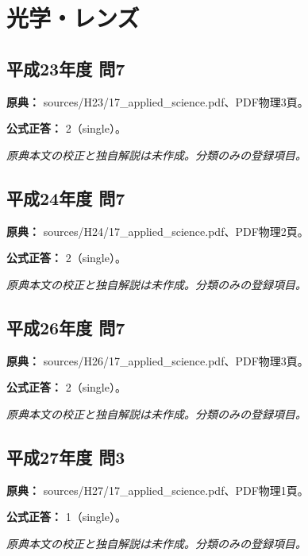 \section{光学・レンズ}

\subsection{平成23年度 問7}
\label{q:h23-reg-applied-07}

\noindent\textbf{原典：} sources/H23/17\_applied\_science.pdf、PDF物理3頁。

\textbf{公式正答：} 2（single）。

\par\textit{原典本文の校正と独自解説は未作成。分類のみの登録項目。}

\subsection{平成24年度 問7}
\label{q:h24-reg-applied-07}

\noindent\textbf{原典：} sources/H24/17\_applied\_science.pdf、PDF物理2頁。

\textbf{公式正答：} 2（single）。

\par\textit{原典本文の校正と独自解説は未作成。分類のみの登録項目。}

\subsection{平成26年度 問7}
\label{q:h26-reg-applied-07}

\noindent\textbf{原典：} sources/H26/17\_applied\_science.pdf、PDF物理3頁。

\textbf{公式正答：} 2（single）。

\par\textit{原典本文の校正と独自解説は未作成。分類のみの登録項目。}

\subsection{平成27年度 問3}
\label{q:h27-reg-applied-03}

\noindent\textbf{原典：} sources/H27/17\_applied\_science.pdf、PDF物理1頁。

\textbf{公式正答：} 1（single）。

\par\textit{原典本文の校正と独自解説は未作成。分類のみの登録項目。}

